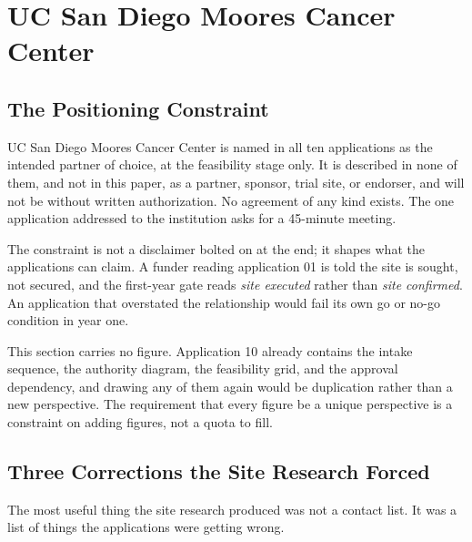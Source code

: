 \section{UC San Diego Moores Cancer Center}

\subsection{The Positioning Constraint}

UC San Diego Moores Cancer Center is named in all ten applications as the
intended partner of choice, at the feasibility stage only. It is described in
none of them, and not in this paper, as a partner, sponsor, trial site, or
endorser, and will not be without written authorization. No agreement of any
kind exists. The one application addressed to the institution asks for a
45-minute meeting.

The constraint is not a disclaimer bolted on at the end; it shapes what the
applications can claim. A funder reading application 01 is told the site is
sought, not secured, and the first-year gate reads \textit{site executed} rather
than \textit{site confirmed}. An application that overstated the relationship
would fail its own go or no-go condition in year one.

This section carries no figure. Application 10 already contains the intake
sequence, the authority diagram, the feasibility grid, and the approval
dependency, and drawing any of them again would be duplication rather than a new
perspective. The requirement that every figure be a unique perspective is a
constraint on adding figures, not a quota to fill.

\subsection{Three Corrections the Site Research Forced}

The most useful thing the site research produced was not a contact list. It was
a list of things the applications were getting wrong.

